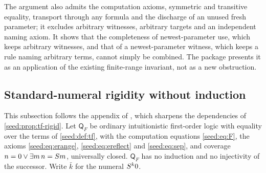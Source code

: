 The argument also admits the computation axioms, symmetric and transitive
equality, transport through any formula and the discharge of an unused fresh
parameter; it excludes arbitrary witnesses, arbitrary targets and an
independent naming axiom. It shows that the completeness of newest-parameter
use, which keeps arbitrary witnesses, and that of a newest-parameter witness,
which keeps a rule naming arbitrary terms, cannot simply be combined. The
package presents it as an application of the existing finite-range invariant,
not as a new obstruction.

\subsection{Standard-numeral rigidity without induction}\label{cert:sec:qf-rigid}

This subsection follows the appendix of , which
sharpens the dependencies of \cref{seed:prop:tf-rigid}. Let $\mathsf Q_F$ be
ordinary intuitionistic first-order logic with equality over the terms of
\cref{seed:def:tf}, with the computation equations \eqref{seed:eq:F}, the
axioms \eqref{seed:eq:erange}, \eqref{seed:eq:ereflect} and \eqref{seed:eq:sep},
and coverage $n=0\lor\exists m\,n=S m$, universally closed. $\mathsf Q_F$ has
no induction and no injectivity of the successor. Write $\bar k$ for the
numeral $S^k0$.

